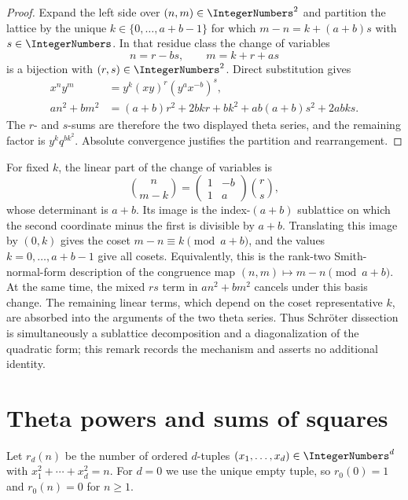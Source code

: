 \begin{proof}
Expand the left side over $(n,m)\in\IntegerNumbers^2$ and partition the
lattice by the unique $k\in\{0,\ldots,a+b-1\}$ for which
$m-n=k+(a+b)s$ with $s\in\IntegerNumbers$.  In that residue class the
change of variables
\[
 n=r-bs,
 \qquad
 m=k+r+as
\]
is a bijection with $(r,s)\in\IntegerNumbers^2$.  Direct substitution gives
\begin{align*}
 x^ny^m&=y^k(xy)^r(y^ax^{-b})^s,\\
 an^2+bm^2
 &=(a+b)r^2+2bkr+bk^2
   +ab(a+b)s^2+2abks.
\end{align*}
The $r$- and $s$-sums are therefore the two displayed theta series, and the
remaining factor is $y^kq^{bk^2}$.  Absolute convergence justifies the
partition and rearrangement.
\end{proof}

\begin{remark}
For fixed $k$, the linear part of the change of variables is
\[
 \binom{n}{m-k}
 =\begin{pmatrix}1&-b\\1&a\end{pmatrix}\binom{r}{s},
\]
whose determinant is $a+b$.  Its image is the index-$(a+b)$ sublattice on
which the second coordinate minus the first is divisible by $a+b$.
Translating this image by $(0,k)$ gives the coset
$m-n\equiv k\pmod{a+b}$, and the values $k=0,\ldots,a+b-1$ give all cosets.
Equivalently, this is the rank-two Smith-normal-form description of the
congruence map $(n,m)\mapsto m-n\pmod{a+b}$.  At the same time, the mixed
$rs$ term in
$an^2+bm^2$ cancels under this basis change.  The remaining linear terms,
which depend on the coset representative $k$, are absorbed into the arguments
of the two theta series.  Thus Schr\"oter dissection is simultaneously a
sublattice decomposition and a diagonalization of the quadratic form; this
remark records the mechanism and asserts no additional identity.
\end{remark}

\section{Theta powers and sums of squares}

Let $r_d(n)$ be the number of ordered $d$-tuples
$(x_1,\ldots,x_d)\in\IntegerNumbers^d$ with
$x_1^2+\cdots+x_d^2=n$.
For $d=0$ we use the unique empty tuple, so
$r_0(0)=1$ and $r_0(n)=0$ for $n\ge1$.

